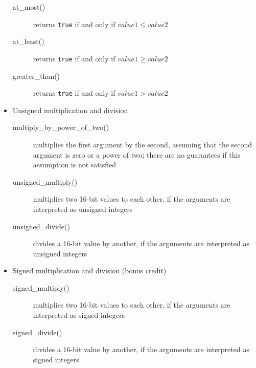\begin{itemize}
\begin{description}
            \item[at\_most()] returns \lstinline{true} if and only if $value1 \leq value2$
            \item[at\_least()] returns \lstinline{true} if and only if $value1 \geq value2$
            \item[greater\_than()] returns \lstinline{true} if and only if $value1 > value2$
        \end{description}
    \item Unsigned multiplication and division
        \begin{description}
            \item[multiply\_by\_power\_of\_two()] multiplies the first argument by the second, assuming that the second argument is zero or a power of two;
                there are no guarantees if this assumption is not satisfied
            \item[unsigned\_multiply()] multiplies two 16-bit values to each other, if the arguments are interpreted as unsigned integers
            \item[unsigned\_divide()] divides a 16-bit value by another, if the arguments are interpreted as unsigned integers
        \end{description}
    \item Signed multiplication and division (bonus credit)
    \begin{description}
        \item[signed\_multiply()] multiplies two 16-bit values to each other, if the arguments are interpreted as signed integers
        \item[signed\_divide()] divides a 16-bit value by another, if the arguments are interpreted as signed integers
    \end{description}
\end{itemize}
